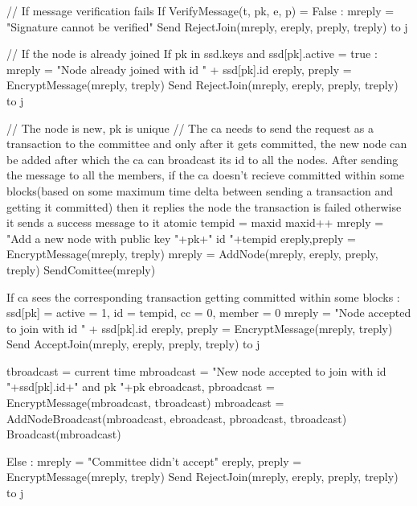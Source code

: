    // If message verification fails
    If VerifyMessage(t, pk, e, p) = False :
        mreply = "Signature cannot be verified"
        Send RejectJoin(mreply, ereply, preply, treply) to j
    
    // If the node is already joined
    If pk in ssd.keys and ssd[pk].active = true :
        mreply = "Node already joined with id " + ssd[pk].id
        ereply, preply = EncryptMessage(mreply, treply)
        Send RejectJoin(mreply, ereply, preply, treply) to j
    
    // The node is new, pk is unique
    // The ca needs to send the request as a transaction to the committee and only after it gets committed, the new node can be added after which the ca can broadcast its id to all the nodes. After sending the message to all the members, if the ca doesn't recieve committed within some blocks(based on some maximum time delta between sending a transaction and getting it committed) then it replies the node the transaction is failed otherwise it sends a success message to it
    atomic {
            tempid = maxid
            maxid++
        }
    mreply = "Add a new node with public key "+pk+" id "+tempid
    ereply,preply = EncryptMessage(mreply, treply)
    mreply = AddNode(mreply, ereply, preply, treply)
    SendComittee(mreply)
    
    If ca sees the corresponding transaction getting committed within some blocks :
        ssd[pk] = {active = 1, id = tempid, cc = 0, member = 0}
        mreply = "Node accepted to join with id " + ssd[pk].id
        ereply, preply = EncryptMessage(mreply, treply)
        Send AcceptJoin(mreply, ereply, preply, treply) to j
        
        tbroadcast = current time
        mbroadcast = "New node accepted to join with id "+ssd[pk].id+" and pk "+pk
        ebroadcast, pbroadcast = EncryptMessage(mbroadcast, tbroadcast)
        mbroadcast = AddNodeBroadcast(mbroadcast, ebroadcast, pbroadcast, tbroadcast)
        Broadcast(mbroadcast)
    
    Else :
        mreply = "Committee didn't accept"
        ereply, preply = EncryptMessage(mreply, treply)
        Send RejectJoin(mreply, ereply, preply, treply) to j